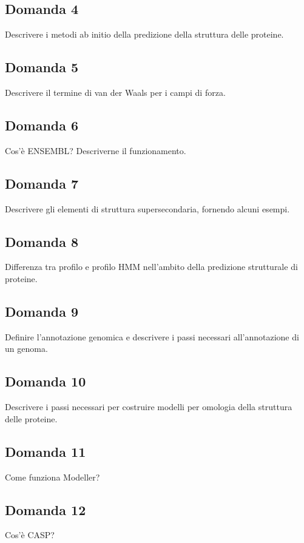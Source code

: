 \documentclass{article}
\begin{document}
\subsection*{Domanda 4}
Descrivere i metodi ab initio della predizione della struttura delle proteine.

\subsection*{Domanda 5}
Descrivere il termine di van der Waals per i campi di forza. 

\subsection*{Domanda 6}
Cos'è ENSEMBL? Descriverne il funzionamento.

\subsection*{Domanda 7}
Descrivere gli elementi di struttura supersecondaria, fornendo alcuni esempi.

\subsection*{Domanda 8}
Differenza tra profilo e profilo HMM nell'ambito della predizione strutturale di proteine.

\subsection*{Domanda 9}
Definire l'annotazione genomica e descrivere i passi necessari all'annotazione di un genoma.

\subsection*{Domanda 10}
Descrivere i passi necessari per costruire modelli per omologia della struttura delle proteine.

\subsection*{Domanda 11}
Come funziona Modeller?

\subsection*{Domanda 12}
Cos'è CASP?
\end{document}

